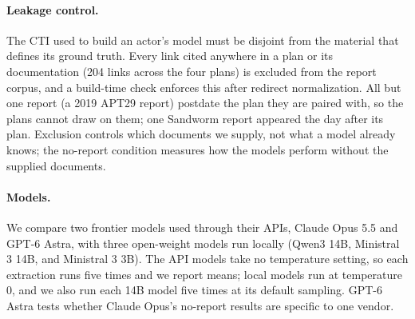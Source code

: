 \documentclass[letterpaper]{article} %
\begin{document}
\paragraph{Leakage control.} The CTI used to build an actor's model must be disjoint from the material that defines its ground truth. Every link cited anywhere in a plan or its documentation (204 links across the four plans) is excluded from the report corpus, and a build-time check enforces this after redirect normalization. All but one report (a 2019 APT29 report) postdate the plan they are paired with, so the plans cannot draw on them; one Sandworm report appeared the day after its plan. Exclusion controls which documents we supply, not what a model already knows; the no-report condition measures how the models perform without the supplied documents.

\paragraph{Models.} We compare two frontier models used through their APIs, Claude Opus 5.5 and GPT-6 Astra, with three open-weight models run locally (Qwen3 14B, Ministral 3 14B, and Ministral 3 3B). The API models take no temperature setting, so each extraction runs five times and we report means; local models run at temperature 0, and we also run each 14B model five times at its default sampling. GPT-6 Astra tests whether Claude Opus's no-report results are specific to one vendor.
\end{document}
